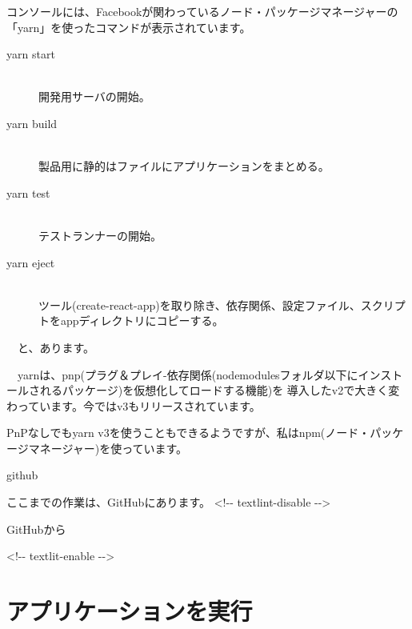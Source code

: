 \begin{starterquote}

コンソールには、Facebookが関わっているノード・パッケージマネージャーの「yarn」を使ったコマンドが表示されています。

\begin{description}
\item[yarn start] \mbox{} \\
開発用サーバの開始。
\item[yarn build] \mbox{} \\
製品用に静的はファイルにアプリケーションをまとめる。
\item[yarn test] \mbox{} \\
テストランナーの開始。
\item[yarn eject] \mbox{} \\
ツール(create{-}react{-}app)を取り除き、依存関係、設定ファイル、スクリプトをappディレクトリにコピーする。
\end{description}

　と、あります。

　yarnは、pnp(プラグ＆プレイ{-}依存関係(node\textunderscore{}modulesフォルダ以下にインストールされるパッケージ)を仮想化してロードする機能)を
導入したv2で大きく変わっています。今ではv3もリリースされています。

PnPなしでもyarn v3を使うこともできるようですが、私はnpm(ノード・パッケージマネージャー)を使っています。

\end{starterquote}
\begin{starternote}[]{github}

ここまでの作業は、GitHubにあります。
\textless{}!{-}{-} textlint{-}disable {-}{-}\textgreater{}

\def\startercodeblockfontsize{}
\begin{starterterminal}[]{GitHubから}\end{starterterminal}

\textless{}!{-}{-} textlit{-}enable {-}{-}\textgreater{}

\end{starternote}

\section{アプリケーションを実行}
\keeplastskip{
  \label{sec:2-2}
  \label{sec-02yarnstart}
  \par\nobreak
}

